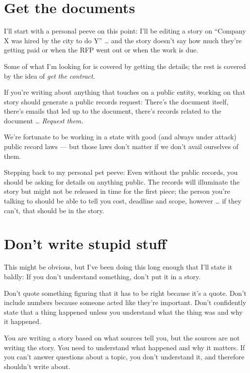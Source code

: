 \documentclass[
  12pt,
  american,
  letterpaperpaper,
  extrafontsizes,onecolumn,openright
  ]{memoir}
\begin{document}
\hypertarget{get-the-documents}{%
\section*{Get the documents}\label{get-the-documents}}

I'll start with a personal peeve on this point: I'll be editing a story on \enquote{Company X was hired by the city to do Y} \ldots{} and the story doesn't say how much they're getting paid or when the RFP went out or when the work is due.

Some of what I'm looking for is covered by getting the details; the rest is covered by the idea of \emph{get the contract}.

If you're writing about anything that touches on a public entity, working on that story should generate a public records request: There's the document itself, there's emails that led up to the document, there's records related to the document \ldots{} \emph{Request them.}

We're fortunate to be working in a state with good (and always under attack) public record laws --- but those laws don't matter if we don't avail ourselves of them.

Stepping back to my personal pet peeve: Even without the public records, you should be asking for details on anything public. The records will illuminate the story but might not be released in time for the first piece; the person you're talking to should be able to tell you cost, deadline and scope, however \ldots{} if they can't, that should be in the story.

\hypertarget{dont-write-stupid-stuff}{%
\section*{Don't write stupid stuff}\label{dont-write-stupid-stuff}}

This might be obvious, but I've been doing this long enough that I'll state it baldly: If you don't understand something, don't put it in a story.

Don't quote something figuring that it has to be right because it's a quote. Don't include numbers because someone acted like they're important. Don't confidently state that a thing happened unless you understand what the thing was and why it happened.

You are writing a story based on what sources tell you, but the sources are not writing the story. You need to understand what happened and why it matters. If you can't answer questions about a topic, you don't understand it, and therefore shouldn't write about.
\end{document}
